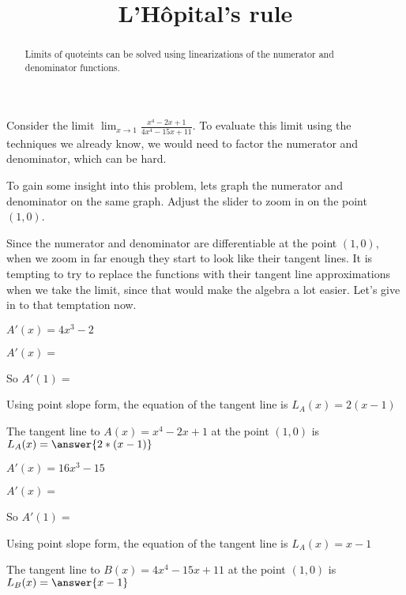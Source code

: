\documentclass{ximera}
\title[Break-Ground:]{L'H\^{o}pital's rule}
\begin{document}
\begin{abstract}
   Limits of quoteints can be solved using linearizations of the numerator and denominator functions.
\end{abstract}

Consider the limit \(\displaystyle\lim_{x \to 1} \frac{x^4-2x+1}{4x^4 - 15x +11}\).  To evaluate this limit using the 
techniques we already know, we would need to factor the numerator and denominator, which can be hard.

To gain some insight into this problem, lets graph the numerator and denominator on the same graph. Adjust the slider
to zoom in on the point $(1,0)$.


Since the numerator and denominator are differentiable at the point $(1,0)$, 
when we zoom in far enough they start to look like their tangent lines.  It is tempting to try to replace the functions
with their tangent line approximations when we take the limit, since that would make the algebra a lot easier.  Let's
give in to that temptation now.

\begin{question}
  \begin{hint}
      \begin{hint}
        $A'(x) = 4x^3-2$
      \end{hint}
      $A'(x)=$
  \end{hint}
  \begin{hint}
    So $A'(1)=$
  \end{hint}
  \begin{hint}
    Using point slope form, the equation of the tangent line is $L_A(x) = 2(x-1)$
  \end{hint}
  
  The tangent line to $A(x) = x^4-2x+1$ at the point $(1,0)$ is $L_A(x) =\answer{2*(x-1)}$
\end{question}

\begin{question}
\begin{hint}
      \begin{hint}
        $A'(x) = 16x^3-15$
      \end{hint}
      $A'(x)=$
  \end{hint}
  \begin{hint}
    So $A'(1)=$
  \end{hint}
  \begin{hint}
    Using point slope form, the equation of the tangent line is $L_A(x) = x-1$
  \end{hint}
  The tangent line to $B(x) = 4x^4-15x+11$ at the point $(1,0)$ is $ L_B(x)= \answer{x-1}$
\end{question}
\end{document}
